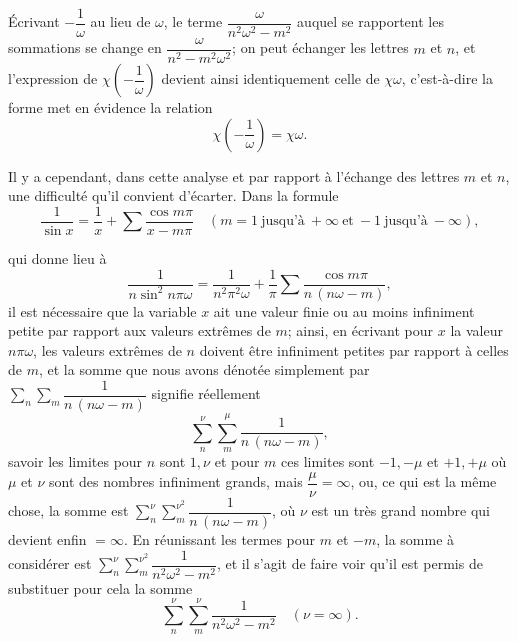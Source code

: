 \documentclass[11pt]{article}
\begin{document}
\'Ecrivant $-\dfrac{1}{\omega}$ au lieu de $\omega$, le terme $\dfrac{\omega}{n^2 \omega^2 - m^2}$ auquel se rapportent les sommations se change en $\dfrac{\omega}{n^2 - m^2 \omega^2}$; on peut \'echanger les lettres $m$ et $n$, et l'expression de $\chi\!\left(-\dfrac{1}{\omega}\right)$ devient ainsi identiquement celle de $\chi\omega$, c'est-\`a-dire la forme met en \'evidence la relation
\[
\chi\!\left(-\frac{1}{\omega}\right) = \chi\omega.
\]

Il y a cependant, dans cette analyse et par rapport \`a l'\'echange des lettres $m$ et $n$, une difficult\'e qu'il convient d'\'ecarter.  Dans la formule
\[
\frac{1}{\sin x} = \frac{1}{x} + \sum \frac{\cos m\pi}{x - m\pi}\quad (m = 1\ \text{jusqu'\`a}\ +\infty\ \text{et}\ -1\ \text{jusqu'\`a}\ -\infty),
\]

qui donne lieu \`a
\[
\frac{1}{n\sin^2 n\pi\omega} = \frac{1}{n^2 \pi^2 \omega} + \frac{1}{\pi}\sum \frac{\cos m\pi}{n\,(n\omega - m)},
\]
il est n\'ecessaire que la variable $x$ ait une valeur finie ou au moins infiniment petite par rapport aux valeurs extr\^emes de $m$; ainsi, en \'ecrivant pour $x$ la valeur $n\pi\omega$, les valeurs extr\^emes de $n$ doivent \^etre infiniment petites par rapport \`a celles de $m$, et la somme que nous avons d\'enot\'ee simplement par $\sum_n \sum_m \dfrac{1}{n\,(n\omega - m)}$ signifie r\'eellement
\[
\sum_n^{\nu}\sum_m^{\mu} \frac{1}{n\,(n\omega - m)},
\]
savoir les limites pour $n$ sont $1, \nu$ et pour $m$ ces limites sont $-1, -\mu$ et $+1, +\mu$ o\`u $\mu$ et $\nu$ sont des nombres infiniment grands, mais $\dfrac{\mu}{\nu} = \infty$, ou, ce qui est la m\^eme chose, la somme est $\sum_n^{\nu}\sum_m^{\nu^2} \dfrac{1}{n\,(n\omega - m)}$, o\`u $\nu$ est un tr\`es grand nombre qui devient enfin $= \infty$. En r\'eunissant les termes pour $m$ et $-m$, la somme \`a consid\'erer est $\sum_n^{\nu}\sum_m^{\nu^2} \dfrac{1}{n^2 \omega^2 - m^2}$, et il s'agit de faire voir qu'il est permis de substituer pour cela la somme
\[
\sum_n^{\nu}\sum_m^{\nu} \frac{1}{n^2 \omega^2 - m^2}\quad (\nu = \infty).
\]
\end{document}
